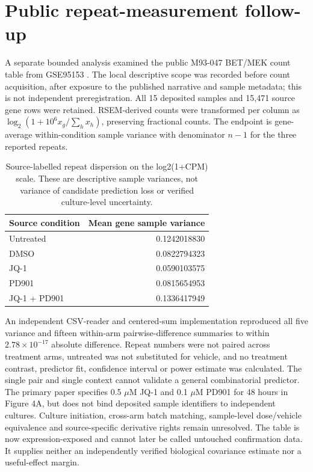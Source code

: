 \section{Public repeat-measurement follow-up}
A separate bounded analysis examined the public M93-047 BET/MEK count table from GSE95153 \citep{echevarria2018}. The local descriptive scope was recorded before count acquisition, after exposure to the published narrative and sample metadata; this is not independent preregistration. All 15 deposited samples and 15,471 source gene rows were retained. RSEM-derived counts were transformed per column as $\log_2(1+10^6 x_g/\sum_h x_h)$, preserving fractional counts. The endpoint is gene-average within-condition sample variance with denominator $n-1$ for the three reported repeats.

\begin{table}[htbp]\centering\small
\caption{Source-labelled repeat dispersion on the log2(1+CPM) scale. These are descriptive sample variances, not variance of candidate prediction loss or verified culture-level uncertainty.}
\begin{tabular}{lr}\toprule
Source condition & Mean gene sample variance \\\midrule
Untreated & 0.1242018830 \\
DMSO & 0.0822794323 \\
JQ-1 & 0.0590103575 \\
PD901 & 0.0815654953 \\
JQ-1 + PD901 & 0.1336417949 \\\bottomrule
\end{tabular}
\end{table}

An independent CSV-reader and centered-sum implementation reproduced all five variance and fifteen within-arm pairwise-difference summaries to within $2.78\times10^{-17}$ absolute difference. Repeat numbers were not paired across treatment arms, untreated was not substituted for vehicle, and no treatment contrast, predictor fit, confidence interval or power estimate was calculated. The single pair and single context cannot validate a general combinatorial predictor. The primary paper specifies 0.5 $\mu$M JQ-1 and 0.1 $\mu$M PD901 for 48 hours in Figure 4A, but does not bind deposited sample identifiers to independent cultures. Culture initiation, cross-arm batch matching, sample-level dose/vehicle equivalence and source-specific derivative rights remain unresolved. The table is now expression-exposed and cannot later be called untouched confirmation data. It supplies neither an independently verified biological covariance estimate nor a useful-effect margin.

